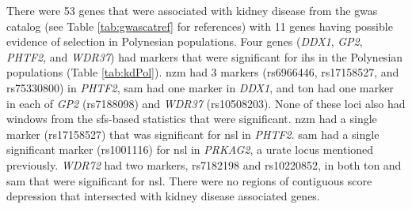 \documentclass[]{report}
\begin{document}
There were 53 genes that were associated with kidney disease from the
\gls{gwas} catalog (see Table \ref{tab:gwascatref} for references) with
11 genes having possible evidence of selection in Polynesian
populations. Four genes (\emph{DDX1}, \emph{GP2}, \emph{PHTF2}, and
\emph{WDR37}) had markers that were significant for \gls{ihs} in the
Polynesian populations (Table \ref{tab:kdPol}). \Gls{nzm} had 3 markers
(rs6966446, rs17158527, and rs75330800) in \emph{PHTF2}, \gls{sam} had
one marker in \emph{DDX1}, and \gls{ton} had one marker in each of
\emph{GP2} (rs7188098) and \emph{WDR37} (rs10508203). None of these loci
also had windows from the \gls{sfs}-based statistics that were
significant. \Gls{nzm} had a single marker (rs17158527) that was
significant for \gls{nsl} in \emph{PHTF2}. \Gls{sam} had a single
significant marker (rs1001116) for \gls{nsl} in \emph{PRKAG2}, a urate
locus mentioned previously. \emph{WDR72} had two markers, rs7182198 and
rs10220852, in both \gls{ton} and \gls{sam} that were significant for
\gls{nsl}. There were no regions of contiguous score depression that
intersected with kidney disease associated genes.

\begingroup\fontsize{8}{10}\selectfont
\end{document}

